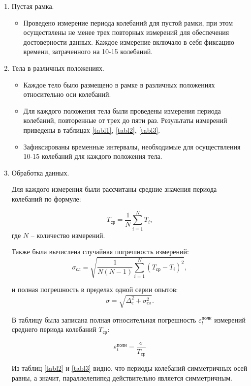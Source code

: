 \begin{enumerate}
\item Пустая рамка.

\begin{itemize}
    \item Проведено измерение периода колебаний для пустой рамки, при этом осуществлены не менее трех повторных измерений для обеспечения достоверности данных.
Каждое измерение включало в себя фиксацию времени, затраченного на 10-15 колебаний.
\end{itemize}


    \item Тела в различных положениях.

    \begin{itemize}
        \item Каждое тело было размещено в рамке в различных положениях относительно оси колебаний.
\item Для каждого положения тела были проведены измерения периода колебаний, повторенные от трех до пяти раз. Результаты измерений приведены в таблицах \ref{tabl1}, \ref{tabl2}, \ref{tabl3}.
\item Зафиксированы временные интервалы, необходимые для осуществления 10-15 колебаний для каждого положения тела.
    \end{itemize}


\item Обработка данных.

Для каждого измерения были рассчитаны средние значения периода колебаний по формуле:

    \begin{equation}
        T_\text{ср} = \frac{1}{N}\sum_{i=1}^{N}T_i,
    \end{equation}
    где $N$ -- количество измерений.

    Также была вычислена случайная погрешность измерений:
    \begin{equation}
        \sigma_\text{сл}=\sqrt{\frac{1}{N\left( N - 1 \right)}\sum_{i=1}^{N}\left( T_\text{ср} - T_i \right)^2 },
    \end{equation}
    
    и полная погрешность в пределах одной серии опытов: 
    \begin{equation}
    \sigma = \sqrt{\Delta_\text{с}^2+\sigma_\text{сл}^2}.
    \end{equation}

    В таблицу была записана полная относительная погрешность $\varepsilon_t^\text{полн}$ измерений среднего периода колебаний $T_\text{ср}$:

    \begin{equation}
        \varepsilon_t^\text{полн} = \frac{\sigma}{T_\text{ср}} 
    \end{equation}

    Из таблиц \ref{tabl2} и \ref{tabl3} видно, что периоды колебаний симметричных осей равны, а значит, параллелепипед действительно является симметричным.


\end{enumerate}

